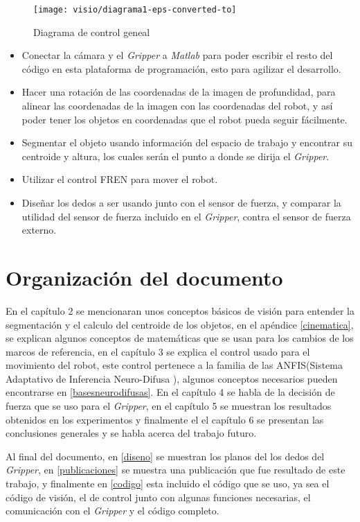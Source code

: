 \begin{figure}[h]
	\centering
	\texttt{[image: visio/diagrama1-eps-converted-to]}
	\caption{Diagrama de control geneal}
	\label{fig:diagrama1-eps-converted-to}
\end{figure}
\begin{itemize}

\item Conectar la cámara y el \textit{Gripper} a \textit{Matlab} para poder escribir el resto del código en esta plataforma de programación, esto para agilizar el desarrollo.

\item Hacer una rotación de las coordenadas de la imagen de profundidad, para alinear las coordenadas de la imagen con las coordenadas del robot, y así poder tener los objetos en coordenadas que el robot pueda seguir fácilmente.

\item Segmentar el objeto usando información del espacio de trabajo y encontrar su centroide y altura, los cuales serán el punto a donde se dirija el \textit{Gripper}.

\item Utilizar el control FREN para mover el robot.

\item Diseñar los dedos a ser usando junto con el sensor de fuerza, y comparar la utilidad del sensor de fuerza incluido en el \textit{Gripper}, contra el sensor de fuerza externo.
\end{itemize}

\section{Organización del documento}


En el capítulo 2 se mencionaran unos conceptos básicos de visión para entender la segmentación y el calculo del centroide de los objetos, en el apéndice \cref{cinematica}, se explican algunos conceptos de matemáticas que se usan para los cambios de los marcos de referencia, en el capítulo 3 se explica el control usado para el movimiento del robot, este control pertenece a la familia de las ANFIS(Sistema Adaptativo de Inferencia Neuro-Difusa ), algunos conceptos necesarios pueden encontrarse en \cref{basesneurodifusas}. En el capítulo 4 se habla de la decisión de fuerza que se uso para el \textit{Gripper}, 
en el capítulo 5 se muestran los resultados obtenidos en los experimentos y finalmente el el capítulo 6 se presentan las conclusiones generales y se habla acerca del trabajo futuro.

Al final del documento, en \cref{diseno} se muestran los planos del los dedos del \textit{Gripper}, en \cref{publicaciones} se muestra una publicación que fue resultado de este trabajo, y finalmente en \cref{codigo} esta incluido el código que se uso, ya sea el código de visión, el de control junto con algunas funciones necesarias, el comunicación con el \textit{Gripper} y el código completo.

